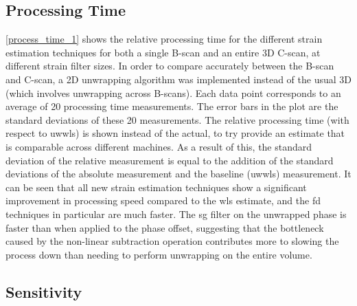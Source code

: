 \subsection{Processing Time}

\autoref{process_time_1} shows the relative processing time for the different strain estimation techniques for both a single B-scan and an entire 3D C-scan, at different strain filter sizes. In order to compare accurately between the B-scan and C-scan, a 2D unwrapping algorithm was implemented instead of the usual 3D (which involves unwrapping across B-scans).
Each data point corresponds to an average of 20 processing time measurements. The error bars in the plot are the standard deviations of these 20 measurements. 
The relative processing time (with respect to \ac{uwwls}) is shown instead of the actual, to try provide an estimate that is comparable across different machines.
As a result of this, the standard deviation of the relative measurement is equal to the addition of the standard deviations of the absolute measurement and the baseline (\ac{uwwls}) measurement.
It can be seen that all new strain estimation techniques show a significant improvement in processing speed compared to the \ac{wls} estimate, and the \ac{fd} techniques in particular are much faster. 
The \ac{sg} filter on the unwrapped phase is faster than when applied to the phase offset, suggesting that the bottleneck caused by the non-linear subtraction operation contributes more to slowing the process down than needing to perform unwrapping on the entire volume. 

\subsection{Sensitivity}

